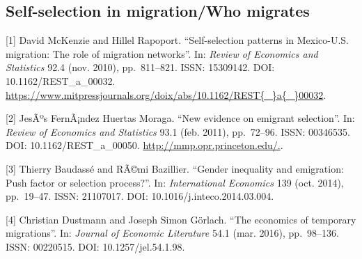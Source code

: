 \documentclass[
  12pt,
]{article}
\begin{document}
\hypertarget{self-selection-in-migrationwho-migrates}{%
\subsection{Self-selection in migration/Who
migrates}\label{self-selection-in-migrationwho-migrates}}

{[}1{]} David McKenzie and Hillel Rapoport. ``Self-selection patterns in
Mexico-U.S. migration: The role of migration networks''. In:
\emph{Review of Economics and Statistics} 92.4 (nov. 2010),
pp.~811--821. ISSN: 15309142. DOI: 10.1162/REST\_a\_00032.
\url{https://www.mitpressjournals.org/doix/abs/10.1162/REST{\_}a{\_}00032}.

{[}2{]} JesÃºs FernÃ¡ndez Huertas Moraga. ``New evidence on emigrant
selection''. In: \emph{Review of Economics and Statistics} 93.1 (feb.
2011), pp.~72--96. ISSN: 00346535. DOI: 10.1162/REST\_a\_00050.
\url{http://mmp.opr.princeton.edu/.}.

{[}3{]} Thierry Baudassé and RÃ©mi Bazillier. ``Gender inequality and
emigration: Push factor or selection process?''. In:
\emph{International Economics} 139 (oct. 2014), pp.~19--47. ISSN:
21107017. DOI: 10.1016/j.inteco.2014.03.004.

{[}4{]} Christian Dustmann and Joseph Simon Görlach. ``The economics of
temporary migrations''. In: \emph{Journal of Economic Literature} 54.1
(mar. 2016), pp.~98--136. ISSN: 00220515. DOI: 10.1257/jel.54.1.98.
\end{document}
